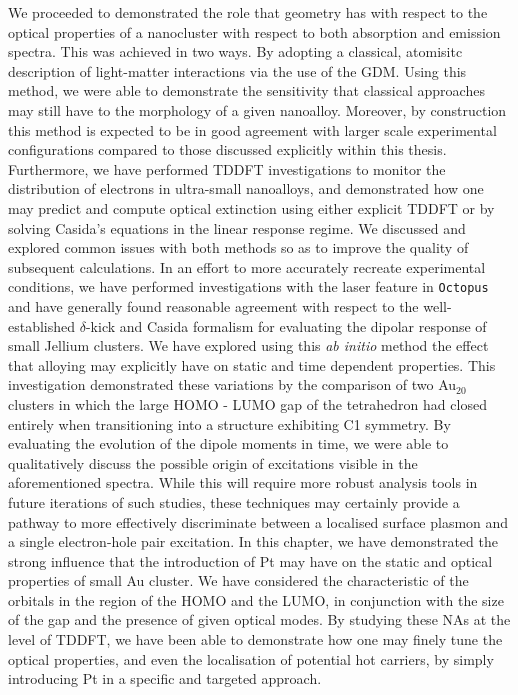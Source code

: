 We proceeded to demonstrated the role that geometry has with respect to the optical properties of a nanocluster with respect to both absorption and emission spectra. This was achieved in two ways. By adopting a classical, atomisitc description of light-matter interactions via the use of the GDM. Using this method, we were able to demonstrate the sensitivity that classical approaches may still have to the morphology of a given nanoalloy. Moreover, by construction this method is expected to be in good agreement with larger scale experimental configurations compared to those discussed explicitly within this thesis. Furthermore, we have performed TDDFT investigations to monitor the distribution of electrons in ultra-small nanoalloys, and demonstrated how one may predict and compute optical extinction using either explicit TDDFT or by solving Casida's equations in the linear response regime. We discussed and explored common issues with both methods so as to improve the quality of subsequent calculations. In an effort to more accurately recreate experimental conditions, we have performed investigations with the laser feature in \texttt{Octopus} and have generally found reasonable agreement with respect to the well-established $\delta$-kick and Casida formalism for evaluating the dipolar response of small Jellium clusters. We have explored using this \textit{ab initio} method the effect that alloying may explicitly have on static and time dependent properties. This investigation demonstrated these variations by the comparison of two Au$_{20}$ clusters in which the large HOMO - LUMO gap of the tetrahedron had closed entirely when transitioning into a structure exhibiting C1 symmetry. By evaluating the evolution of the dipole moments in time, we were able to qualitatively discuss the possible origin of excitations visible in the aforementioned spectra. While this will require more robust analysis tools in future iterations of such studies, these techniques may certainly provide a pathway to more effectively discriminate between a localised surface plasmon and a single electron-hole pair excitation. In this chapter, we have demonstrated the strong influence that the introduction of Pt may have on the static and optical properties of small Au cluster. We have considered the characteristic of the orbitals in the region of the HOMO and the LUMO, in conjunction with the size of the gap and the presence of given optical modes. By studying these NAs at the level of TDDFT, we have been able to demonstrate how one may finely tune the optical properties, and even the localisation of potential hot carriers, by simply introducing Pt in a specific and targeted approach.

